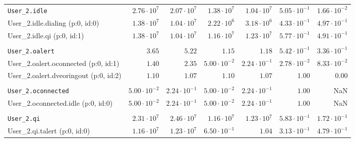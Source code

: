 \begin{table}[htbp]
{\begin{tabular}{lrrrrrr}
\\[-8pt]\texttt{User\_2.idle}                         &  $2.76 \cdot 10^{7}$ &  $2.07 \cdot 10^{7}$ &  $1.38 \cdot 10^{7}$ &  $1.04 \cdot 10^{7}$ & $5.05 \cdot 10^{-1}$ & $1.66 \cdot 10^{-2}$ \\
\hspace{3mm}User\_2.idle.dialing (p:0, id:0)          &  $1.38 \cdot 10^{7}$ &  $1.04 \cdot 10^{7}$ &  $2.22 \cdot 10^{6}$ &  $3.18 \cdot 10^{6}$ & $4.33 \cdot 10^{-1}$ & $4.97 \cdot 10^{-1}$ \\
\hspace{3mm}User\_2.idle.qi (p:0, id:1)               &  $1.38 \cdot 10^{7}$ &  $1.04 \cdot 10^{7}$ &  $1.16 \cdot 10^{7}$ &  $1.23 \cdot 10^{7}$ & $5.77 \cdot 10^{-1}$ & $4.91 \cdot 10^{-1}$ \\
\\[-8pt]\texttt{User\_2.oalert}                       &               $3.65$ &               $5.22$ &               $1.15$ &               $1.18$ & $5.42 \cdot 10^{-1}$ & $3.36 \cdot 10^{-1}$ \\
\hspace{3mm}User\_2.oalert.oconnected (p:0, id:1)     &               $1.40$ &               $2.35$ & $5.00 \cdot 10^{-2}$ & $2.24 \cdot 10^{-1}$ & $2.78 \cdot 10^{-2}$ & $8.33 \cdot 10^{-2}$ \\
\hspace{3mm}User\_2.oalert.dveoringout (p:0, id:2)    &               $1.10$ &               $1.07$ &               $1.10$ &               $1.07$ &               $1.00$ &               $0.00$ \\
\\[-8pt]\texttt{User\_2.oconnected}                   & $5.00 \cdot 10^{-2}$ & $2.24 \cdot 10^{-1}$ & $5.00 \cdot 10^{-2}$ & $2.24 \cdot 10^{-1}$ &               $1.00$ &                  NaN \\
\hspace{3mm}User\_2.oconnected.idle (p:0, id:0)       & $5.00 \cdot 10^{-2}$ & $2.24 \cdot 10^{-1}$ & $5.00 \cdot 10^{-2}$ & $2.24 \cdot 10^{-1}$ &               $1.00$ &                  NaN \\
\\[-8pt]\texttt{User\_2.qi}                           &  $2.31 \cdot 10^{7}$ &  $2.46 \cdot 10^{7}$ &  $1.16 \cdot 10^{7}$ &  $1.23 \cdot 10^{7}$ & $5.83 \cdot 10^{-1}$ & $1.72 \cdot 10^{-1}$ \\
\hspace{3mm}User\_2.qi.talert (p:0, id:0)             &  $1.16 \cdot 10^{7}$ &  $1.23 \cdot 10^{7}$ & $6.50 \cdot 10^{-1}$ &               $1.04$ & $3.13 \cdot 10^{-1}$ & $4.79 \cdot 10^{-1}$ \\

\end{tabular}}
\end{table}
